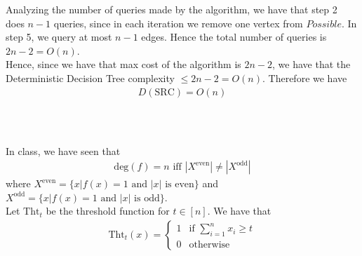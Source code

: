 \documentclass{article}
\begin{document}
\noindent
Analyzing the number of queries made by the algorithm, we have that step 2 does $n-1$ queries, since in each iteration we remove one vertex from $Possible$. In step 5, we query at most $n-1$ edges. Hence the total number of queries is $2n-2 = O(n)$.\\

\noindent
Hence, since we have that max cost of the algorithm is $2n-2$, we have that the Deterministic Decision Tree complexity $\leq 2n-2 = O(n)$. Therefore we have
\begin{align*}
	\boxed{D(\text{SRC}) = O(n)}
\end{align*}
\vspace*{-12mm}\begin{flushright}\qedsymbol\end{flushright}

\,
\subsection{} \vspace*{-8mm}

In class, we have seen that
\begin{align}
	\text{deg}(f) = n \text{ iff } |X^\text{even}| \neq |X^\text{odd}|
\end{align}
where $X^\text{even} = \{x | f(x) = 1 \text{ and } |x| \text{ is even}\}$ and $X^\text{odd} = \{x | f(x) = 1 \text{ and } |x| \text{ is odd}\}$. \\

\noindent
Let $\text{Tht}_t$ be the threshold function for $t \in [n]$. We have that
\begin{align}
	\text{Tht}_t(x) = \begin{cases}
		1 & \text{if } \sum_{i=1}^n x_i \geq t \\
		0 & \text{otherwise}
	\end{cases}
\end{align}
\end{document}
